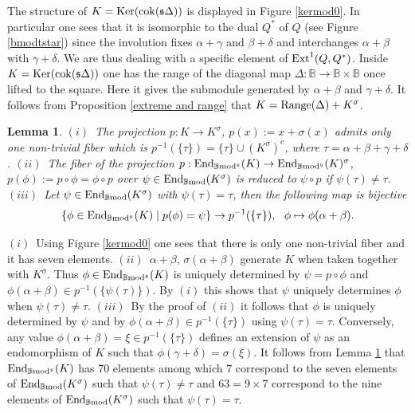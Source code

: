 \documentclass[12pt]{article}
\newtheorem{lem}[thm]{Lemma}
\def\End{{\rm End}}
\def\ext{{\rm Ext}}
\def\scoker{{\rm cok}}
\def\B{{\mathbb B}}
\def\ker{{\mbox{Ker}}}
\def\End{{\mbox{End}}}
\def\yb{\mathfrak{s}}
\def\bmod{{\rm \B mod}}
\def\b2{{\rm \B mod^{\mathfrak s}}}
\begin{document}
The structure of $K=\ker(\scoker(\yb\Delta))$ is displayed in Figure \ref{kermod0}. In particular one sees that it is isomorphic to the dual $Q^*$ of $Q$ (see Figure \ref{bmodtstar}) since the involution fixes $\alpha+\gamma$ and $\beta+\delta$ and interchanges $\alpha+\beta$ with $\gamma+\delta$. We are thus dealing with a specific element of $\ext^1(Q,Q^*)$. Inside $K=\ker(\scoker(\yb\Delta))$ one has the range of the diagonal map $\Delta:\B\to \B\times\B$ once lifted to the square. Here it gives the submodule generated by $\alpha+\beta$ and $\gamma+\delta$. It follows from Proposition \ref{extreme and range} that $K={\rm Range}(\Delta)+K^\sigma$. 
 \begin{lem}\label{structure of K} $(i)$~The projection $p:K\to K^\sigma$, $p(x):=x+\sigma(x)$ admits only one non-trivial fiber which is $p^{-1}(\{\tau\})=\{\tau\}\cup (K^\sigma)^c$, where $\tau=\alpha+\beta+\gamma +\delta$. \newline
 $(ii)$~The fiber of the projection $p:\End_\b2(K)\to \End_\b2(K)^\sigma$, $p(\phi):=p\circ \phi=\phi\circ p$ over $\psi\in \End_\bmod(K^\sigma)$ is reduced to $\psi\circ p$ if $\psi(\tau)\neq \tau$.\newline
 $(iii)$~Let $\psi\in \End_\bmod(K^\sigma)$ with $\psi(\tau)=\tau$, then the following map is bijective
 $$
 \{\phi\in \End_\b2(K)\mid p(\phi)=\psi\}\to p^{-1}(\{\tau\}),\ \ \phi\mapsto \phi(\alpha+\beta).
 $$ 	
 \end{lem}
 \proof $(i)$~Using Figure \ref{kermod0} one sees that there is only one non-trivial fiber and it has seven elements. \newline
 $(ii)$~$\alpha+\beta$, $\sigma(\alpha+\beta)$ generate $K$ when taken together with $K^\sigma$. Thus $\phi\in \End_\b2(K)$ is uniquely determined by $\psi=p\circ\phi$ and $\phi(\alpha+\beta)\in p^{-1}(\{\psi(\tau)\})$. By $(i)$ this shows that $\psi$ uniquely determines $\phi$ when $\psi(\tau)\neq \tau$.\newline
    $(iii)$~By the proof of $(ii)$ it follows that $\phi$ is uniquely determined by $\psi$ and by $\phi(\alpha+\beta)\in p^{-1}(\{\tau\})$ using $\psi(\tau)=\tau$. Conversely, any value  $\phi(\alpha+\beta)=\xi\in p^{-1}(\{\tau\})$ defines an extension of $\psi$ as an  endomorphism of $K$ such that $\phi(\gamma+\delta)=\sigma(\xi)$.\endproof
    It follows from Lemma \ref{structure of K} that  $\End_\b2(K)$ has $70$ elements among which $7$ correspond to the seven elements of $\End_\bmod(K^\sigma)$ such that $\psi(\tau)\neq \tau$ and $63=9\times 7$ correspond to the nine elements of $\End_\bmod(K^\sigma)$ such that $\psi(\tau)= \tau$.
\end{document}
